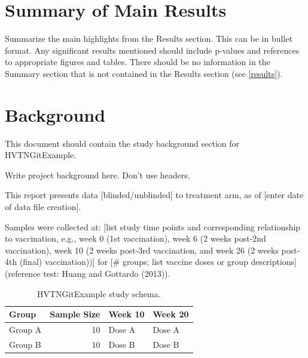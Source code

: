 \documentclass[11pt]{article}
\begin{document}
\listoffigures

\listoftables

\newpage
{}
\fancyhead[C]{}

\clearpage

\hypertarget{summary-of-main-results}{%
\section{Summary of Main Results}\label{summary-of-main-results}}

Summarize the main highlights from the Results section.
This can be in bullet format.
Any significant results mentioned should include p-values and references to
appropriate figures and tables.
There should be no information in the Summary section that is not contained in
the Results section (see \ref{results}).

\hypertarget{background}{%
\section{Background}\label{background}}

This document should contain the study background section for HVTNGitExample.

Write project background here. Don't use headers.

This report presents data {[}blinded/unblinded{]} to treatment arm,
as of {[}enter date of data file creation{]}.

Samples were collected at:
{[}list study time points and corresponding relationship to vaccination,
e.g., week 0 (1st vaccination),
week 6 (2 weeks post-2nd vaccination),
week 10 (2 weeks post-3rd vaccination,
and week 26 (2 weeks post-4th (final) vaccination)){]}
for {[}\# groups; list vaccine doses or group descriptions{]}
(reference test: Huang and Gottardo (2013)).

\begin{table}[!h]

\caption{\label{tab:study-schema}HVTNGitExample study schema.}
\centering
\begin{tabular}[t]{lrll}
\toprule
Group & Sample Size & Week 10 & Week 20\\
\midrule
Group A & 10 & Dose A & Dose A\\
Group B & 10 & Dose B & Dose B\\
\bottomrule
\end{tabular}
\end{table}
\end{document}
